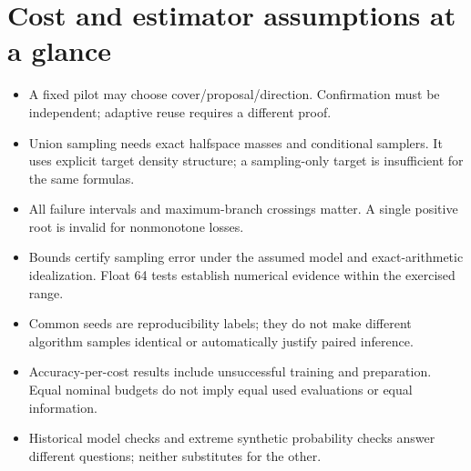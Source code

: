 \documentclass[11pt]{article}
\begin{document}
\section{Cost and estimator assumptions at a glance}
\begin{itemize}
\item A fixed pilot may choose cover/proposal/direction. Confirmation must be independent; adaptive reuse requires a different proof.
\item Union sampling needs exact halfspace masses and conditional samplers. It uses explicit target density structure; a sampling-only target is insufficient for the same formulas.
\item All failure intervals and maximum-branch crossings matter. A single positive root is invalid for nonmonotone losses.
\item Bounds certify sampling error under the assumed model and exact-arithmetic idealization. Float 64 tests establish numerical evidence within the exercised range.
\item Common seeds are reproducibility labels; they do not make different algorithm samples identical or automatically justify paired inference.
\item Accuracy-per-cost results include unsuccessful training and preparation. Equal nominal budgets do not imply equal used evaluations or equal information.
\item Historical model checks and extreme synthetic probability checks answer different questions; neither substitutes for the other.
\end{itemize}

\raggedright


\end{document}
